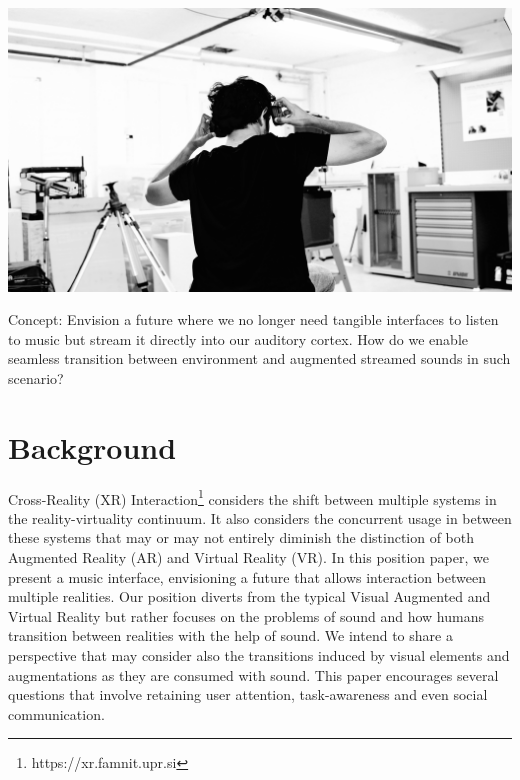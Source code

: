 \documentclass[sigchi]{acmart}
\begin{document}
\begin{teaserfigure}
  \includegraphics[trim={0 5.5cm 0 3.5cm}, clip, width=\textwidth]{acmart-master-2/samples/test2bw.png}
  \caption{Concept: Envision a future where we no longer need tangible interfaces to listen to music but stream it directly into our auditory cortex. How do we enable seamless transition between environment and augmented streamed sounds in such scenario?}
  \label{fig:teaser}
\end{teaserfigure}
\maketitle

\section{Background}
Cross-Reality (XR) Interaction\footnote{https://xr.famnit.upr.si} considers the shift between multiple systems in the reality-virtuality continuum. It also considers the concurrent usage in between these systems that may or may not entirely diminish the distinction of both Augmented Reality (AR) and Virtual Reality (VR). In this position paper, we present a music interface, envisioning a future that allows interaction between multiple realities. Our position diverts from the typical Visual Augmented and Virtual Reality but rather focuses on the problems of sound and how humans transition between realities with the help of sound. We intend to share a perspective that may consider also the transitions induced by visual elements and augmentations as they are consumed with sound. This paper encourages several questions that involve retaining user attention, task-awareness and even social communication. 
\end{document}
